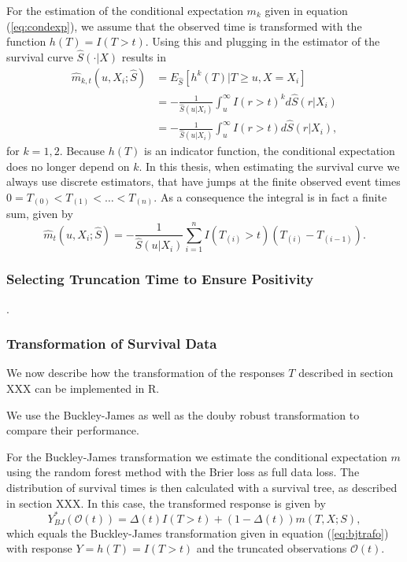 \documentclass[12pt, a4paper]{article}
\theoremstyle{definition}
\theoremstyle{plain}
\numberwithin{equation}{section}
\numberwithin{figure}{section}
\numberwithin{table}{section}
\begin{document}
	For the estimation of the conditional expectation $m_k$ given in equation (\ref{eq:condexp}), we assume that the observed time is transformed with the function $h(T) = I(T>t)$.
	Using this and plugging in the estimator of the survival curve $\hat{S}(\cdot\vert X)$ results in
	\begin{equation*}
	\begin{split}
	\hat{m}_{k,t} (u, X_i; \hat{S}) &= E_{\hat{S}}[h^k(T)\vert T \geq u, X=X_i]\\
	&=-\frac{1}{\hat{S}(u\vert X_i)}\int_u^{\infty}I(r> t)^kd\hat{S}(r\vert X_i)\\
	&=-\frac{1}{\hat{S}(u\vert X_i)}\int_u^{\infty}I(r> t)d\hat{S}(r\vert X_i),
	\end{split}
	\end{equation*}
	for $k=1,2$.
	Because $h(T)$ is an indicator function, the conditional expectation does no longer depend on $k$.
	In this thesis, when estimating the survival curve we always use discrete estimators, that have jumps at the finite observed event times $0=T_{(0)}<T_{(1)}<\dots<T_{(n)}$.
	As a consequence the integral is in fact a finite sum, given by
	\begin{equation*}
	\hat{m}_t (u, X_i; \hat{S}) = -\frac{1}{\hat{S}(u\vert X_i)}\sum_{i=1}^n I(T_{(i)}>t)(T_{(i)}-T_{(i-1)}).
	\end{equation*}
	
	
	\subsubsection{Selecting Truncation Time to Ensure Positivity}
	
	\citet*{drtrees}.
	
	\subsubsection{Transformation of Survival Data}
	
	We now describe how the transformation of the responses $T$ described in section XXX can be implemented in R.
	
	We use the Buckley-James as well as the douby robust transformation to compare their performance.
	
	For the Buckley-James transformation we estimate the conditional expectation $m$ using the random forest method with the Brier loss as full data loss.
	The distribution of survival times is then calculated with a survival tree, as described in section XXX.
	In this case, the transformed response is given by
	\begin{equation*}
	Y^*_{BJ}(\mathcal{O}(t)) = \Delta(t)I(T>t)+ (1-\Delta(t))m(T, X; S),
	\end{equation*}
	which equals the Buckley-James transformation given in equation (\ref{eq:bjtrafo}) with response $Y=h(T)=I(T>t)$ and the truncated observations $\mathcal{O}(t)$.
	
\end{document}
